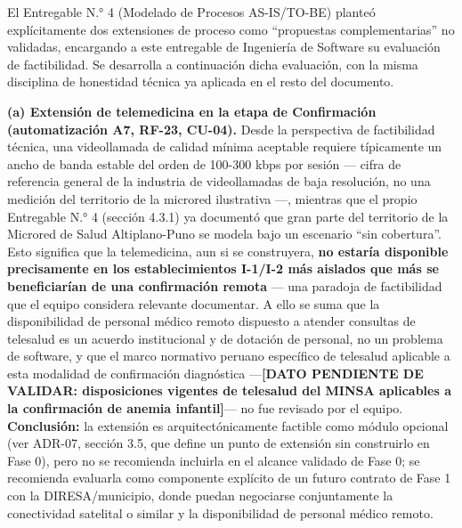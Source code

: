 \documentclass[11pt,a4paper]{article}
\begin{document}
El Entregable N.° 4 (Modelado de Procesos AS-IS/TO-BE) planteó explícitamente dos extensiones de proceso como ``propuestas complementarias'' no validadas, encargando a este entregable de Ingeniería de Software su evaluación de factibilidad. Se desarrolla a continuación dicha evaluación, con la misma disciplina de honestidad técnica ya aplicada en el resto del documento.

\textbf{(a) Extensión de telemedicina en la etapa de Confirmación (automatización A7, RF-23, CU-04).} Desde la perspectiva de factibilidad técnica, una videollamada de calidad mínima aceptable requiere típicamente un ancho de banda estable del orden de 100-300 kbps por sesión --- cifra de referencia general de la industria de videollamadas de baja resolución, no una medición del territorio de la microred ilustrativa ---, mientras que el propio Entregable N.° 4 (sección 4.3.1) ya documentó que gran parte del territorio de la Microred de Salud Altiplano-Puno se modela bajo un escenario ``sin cobertura''. Esto significa que la telemedicina, aun si se construyera, \textbf{no estaría disponible precisamente en los establecimientos I-1/I-2 más aislados que más se beneficiarían de una confirmación remota} --- una paradoja de factibilidad que el equipo considera relevante documentar. A ello se suma que la disponibilidad de personal médico remoto dispuesto a atender consultas de telesalud es un acuerdo institucional y de dotación de personal, no un problema de software, y que el marco normativo peruano específico de telesalud aplicable a esta modalidad de confirmación diagnóstica ---\textbf{{[}DATO PENDIENTE DE VALIDAR: disposiciones vigentes de telesalud del MINSA aplicables a la confirmación de anemia infantil{]}}--- no fue revisado por el equipo. \textbf{Conclusión:} la extensión es arquitectónicamente factible como módulo opcional (ver ADR-07, sección 3.5, que define un punto de extensión sin construirlo en Fase 0), pero no se recomienda incluirla en el alcance validado de Fase 0; se recomienda evaluarla como componente explícito de un futuro contrato de Fase 1 con la DIRESA/municipio, donde puedan negociarse conjuntamente la conectividad satelital o similar y la disponibilidad de personal médico remoto.
\end{document}
